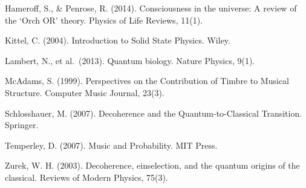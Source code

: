 \documentclass[a4paper,11pt]{article}
\begin{document}
Hameroff, S., \& Penrose, R. (2014). Consciousness in the universe: A
review of the `Orch OR' theory. Physics of Life Reviews, 11(1).

Kittel, C. (2004). Introduction to Solid State Physics. Wiley.

Lambert, N., et al.~(2013). Quantum biology. Nature Physics, 9(1).

McAdams, S. (1999). Perspectives on the Contribution of Timbre to
Musical Structure. Computer Music Journal, 23(3).

Schlosshauer, M. (2007). Decoherence and the Quantum-to-Classical
Transition. Springer.

Temperley, D. (2007). Music and Probability. MIT Press.

Zurek, W. H. (2003). Decoherence, einselection, and the quantum origins
of the classical. Reviews of Modern Physics, 75(3).
\end{document}

